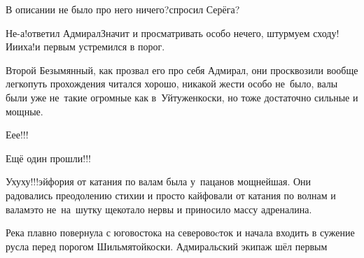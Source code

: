 \diagdash В описании не было про него ничего?\mdash спросил Серёга?

\diagdash Не-а!\mdash ответил Адмирал\mdash Значит и просматривать особо нечего, штурмуем сходу! И\sdash и\sdash и\sdash ха!\mdash и первым устремился в порог.

Второй Безымянный, как прозвал его про себя Адмирал, они просквозили вообще легко\mdash путь прохождения читался хорошо, никакой жести особо не~было, валы были уже не~такие огромные как в~Уйтуженкоски, но тоже достаточно сильные и мощные.

\diagdash Е\sdash е\sdash е!!!

\diagdash Ещё один прошли!!!

\diagdash У\sdash ху\sdash ху!!!\mdash эйфория от катания по валам была у~пацанов мощнейшая. Они радовались преодолению стихии и просто кайфовали от катания по волнам и валам\mdash это не~на~шутку щекотало нервы и приносило массу адреналина.

Река плавно повернула с юго\sdash востока на северо\sdash воcток и начала входить в сужение русла перед порогом Шильмятойкоски. Адмиральский экипаж шёл первым










\begin{center}
\end{center}
